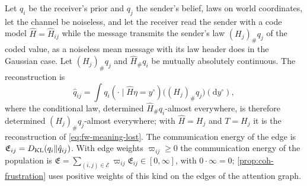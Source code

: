 \begin{definition}\label{def:fw-comm-energy}
Let $q_i$ be the receiver's prior and $q_j$ the sender's belief, laws on world coordinates, let the channel be noiseless, and let the receiver read the sender with a code model $\hat H=\hat H_{ij}$ while the message transmits the sender's law $(H_j)_\#q_j$ of the coded value, as a noiseless mean message with its law header does in the Gaussian case. Let $(H_j)_\#q_j$ and $\hat H_\#q_i$ be mutually absolutely continuous. The reconstruction is
\begin{equation}\label{eq:fw-reconstruction}
\hat q_{ij}=\int q_i(\cdot\mid\hat H\eta=y^\circ)\bigl((H_j)_\#q_j\bigr)(\mathrm dy^\circ),
\end{equation}
where the conditional law, determined $\hat H_\#q_i$-almost everywhere, is therefore determined $(H_j)_\#q_j$-almost everywhere; with $\hat H=H_j$ and $T=H_j$ it is the reconstruction of \eqref{eq:fw-meaning-lost}. The communication energy of the edge is $\mathfrak E_{ij}=D_{\mathrm{KL}}(q_i\Vert\hat q_{ij})$. With edge weights $\varpi_{ij}\ge0$ the communication energy of the population is $\mathfrak E=\sum_{(i,j)\in\mathcal E}\varpi_{ij}\mathfrak E_{ij}\in[0,\infty]$, with $0\cdot\infty=0$; \cref{prop:coh-frustration} uses positive weights of this kind on the edges of the attention graph.
\end{definition}

